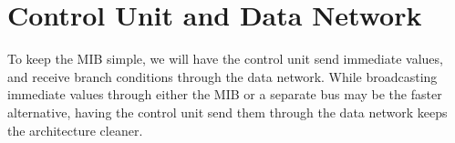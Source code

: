 \documentclass[adraft]{eptcs}
\begin{document}
	\section{Control Unit and Data Network}
		To keep the MIB simple, we will have the control unit send immediate values, and receive branch conditions through the data network.
		While broadcasting immediate values through either the MIB or a separate bus may be the faster alternative, having the control unit send them through the data network keeps the architecture cleaner.

	\nocite{*}
	
\end{document}
